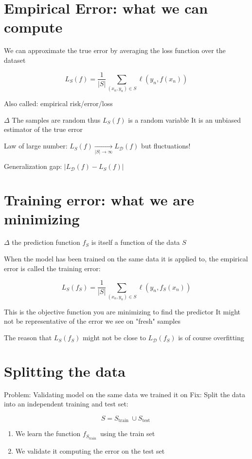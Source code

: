 \section*{Empirical Error: what we can compute}
We can approximate the true error by averaging the loss function over the dataset

$$
L_{S}(f)=\frac{1}{|S|} \sum_{\left(x_{n}, y_{n}\right) \in S} \ell\left(y_{n}, f\left(x_{n}\right)\right)
$$

Also called: empirical risk/error/loss

$\Delta$ The samples are random thus $L_{S}(f)$ is a random variable It is an unbiased estimator of the true error

Law of large number: $L_{S}(f) \underset{|S| \rightarrow \infty}{\rightarrow} L_{\mathscr{D}}(f)$ but fluctuations!

Generalization gap: $\left|L_{\mathscr{D}}(f)-L_{S}(f)\right|$

\section*{Training error: what we are minimizing}
$\Delta$ the prediction function $f_{S}$ is itself a function of the data $S$

When the model has been trained on the same data it is applied to, the empirical error is called the training error:

$$
L_{S}\left(f_{S}\right)=\frac{1}{|S|} \sum_{\left(x_{n}, y_{n}\right) \in S} \ell\left(y_{n}, f_{S}\left(x_{n}\right)\right)
$$

This is the objective function you are minimizing to find the predictor It might not be representative of the error we see on "fresh" samples

The reason that $L_{S}\left(f_{S}\right)$ might not be close to $L_{\mathscr{D}}\left(f_{S}\right)$ is of course overfitting

\section*{Splitting the data}
Problem: Validating model on the same data we trained it on Fix: Split the data into an independent training and test set:

$$
S=S_{\text {train }} \cup S_{\text {test }}
$$

\begin{enumerate}
  \item We learn the function $f_{S_{\text {train }}}$ using the train set

  \item We validate it computing the error on the test set

\end{enumerate}

